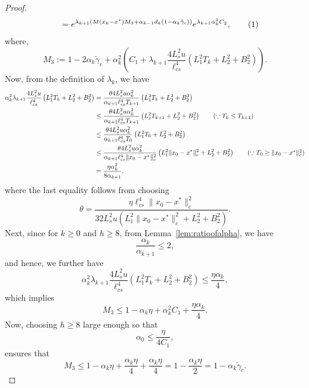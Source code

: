 \documentclass{article}
\newcommand{\numberthis}{\addtocounter{equation}{1}\tag{\theequation}}
\newcommand{\lrp}[1]{\left( #1 \right)}
\newcommand{\lcs}{\ell_{cs}}
\newcommand{\xk}{x_k}
\begin{document}
\begin{proof}
\begin{align*}
        &\qquad =  e^{ \lambda_{k+1}\lrp{M(\xk - x^*) M_3 + \alpha_{k-1}d_k (1-\alpha_k \tilde{\gamma}_c) }} e^{\lambda_{k+1} \alpha^2_k C_2}, \numberthis \label{eq:condbound1}
        \end{align*}
        where, 
        \[ M_3 := 1 - 2\alpha_k\tilde{\gamma}_c + \alpha^2_k \lrp{  C_1 + \lambda_{k+1}  \frac{ 4 L^2_s u}{\lcs^4}\lrp{L^2_1 T_k + L^2_2 + B^2_2 }  }. \]
    Now, from the definition of $\lambda_k$, we have
    \begin{align*}
        \alpha^2_k \lambda_{k+1}\frac{4 L^2_s u}{\lcs^4}\lrp{L^2_1 T_k + L^2_2 + B^2_2}
        &=    \frac{\theta 4 L^2_s u \alpha^2_k}{\alpha_{k+1}\lcs^4 T_{k+1}}\lrp{L^2_1 T_k + L^2_2 + B^2_2} \\
        &\le \frac{\theta 4 L^2_s u \alpha^2_k}{\alpha_{k+1}\lcs^4 T_{k+1}}\lrp{L^2_1 T_{k+1} + L^2_2 + B^2_2} \tag{$\because T_k\le T_{k+1}$}\\
        &\le \frac{\theta 4 L^2_s u \alpha^2_k}{\alpha_{k+1}\lcs^4 T_0}\lrp{L^2_1 T_0 + L^2_2 + B^2_2}\\
        &\le \frac{\theta 4 L^2_s u \alpha^2_k}{\alpha_{k+1}\lcs^4 \|x_0 - x^*\|^2_c}\lrp{L^2_1 \|x_0 - x^*\|^2_c + L^2_2 + B^2_2} \tag{$\because T_0 \ge \|x_0 - x^*\|^2_c$} \\
        &= \frac{\eta \alpha^2_k}{8 \alpha_{k+1}},
    \end{align*}
    where the last equality follows from choosing 
    \[ \theta =  \frac{\eta \lcs^4 \|x_0 - x^*\|^2_c}{32 L^2_s u  \lrp{L^2_1\|x_0 - x^*\|^2_c + L^2_2 + B^2_2} }. \]
    Next, since for $k \ge 0$ and $h \ge 8$, from Lemma~\ref{lem:ratioofalpha}, we have 
    \[ \frac{\alpha_{k}}{\alpha_{k+1}} \le 2, \]
    and hence, we further have
    \[ \alpha^2_k \lambda_{k+1}  \frac{4 L^2_s u}{\lcs^4}\lrp{L^2_1 T_k + L^2_2 + B^2_2} \le \frac{\eta \alpha_k}{4}, \]
    which implies 
    \[ M_3 \le  1 - \alpha_k \eta + \alpha^2_k C_1 + \frac{\eta\alpha_k}{4}. \]
    Now, choosing $h \ge 8$ large enough so that \[ \alpha_0  \le \frac{\eta}{4 C_1}, \]
    ensures that 
    \[ M_3 \le 1 - \alpha_k \eta + \frac{\alpha_k \eta}{4} + \frac{\alpha_k \eta}{4} = 1 - \frac{\alpha_k \eta}{2} = 1 - \alpha_k \tilde{\gamma}_c. \]


\end{proof}
\end{document}
